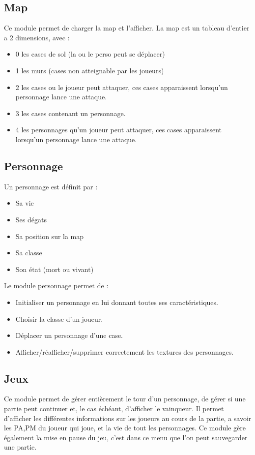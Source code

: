 \documentclass[a4paper, 11pt]{article}
\begin{document}
\subsection{Map}
Ce module permet de charger la map et l'afficher. La map est un tableau d'entier a 2 dimensions, avec :
\begin{itemize}
\item 0 les cases de sol (la ou le perso peut se déplacer)
\item 1 les murs (cases non atteignable par les joueurs)
\item 2 les cases ou le joueur peut attaquer, ces cases apparaissent lorsqu'un personnage lance une attaque.
\item 3 les cases contenant un personnage.
\item 4 les personnages qu'un joueur peut attaquer, ces cases apparaissent lorsqu'un personnage lance une attaque.
\end{itemize}

\subsection{Personnage}
Un personnage est définit par :
\begin{itemize}
\item Sa vie
\item Ses dégats
\item Sa position sur la map
\item Sa classe
\item Son état (mort ou vivant)
\end{itemize}

Le module personnage permet de :
\begin{itemize}
\item Initialiser un personnage en lui donnant toutes ses caractéristiques.
\item Choisir la classe d'un joueur.
\item Déplacer un personnage d'une case.
\item Afficher/réafficher/supprimer correctement les textures des personnages.
\end{itemize}

\subsection{Jeux}
Ce module permet de gérer entièrement le tour d'un personnage, de gérer si une partie peut continuer et, le cas échéant, d'afficher le vainqueur. Il permet d'afficher les différentes informations sur les joueurs au cours de la partie, a savoir les PA,PM du joueur qui joue, et la vie de tout les personnages.
Ce module gère également la mise en pause du jeu, c'est dans ce menu que l'on peut sauvegarder une partie.
\end{document}
